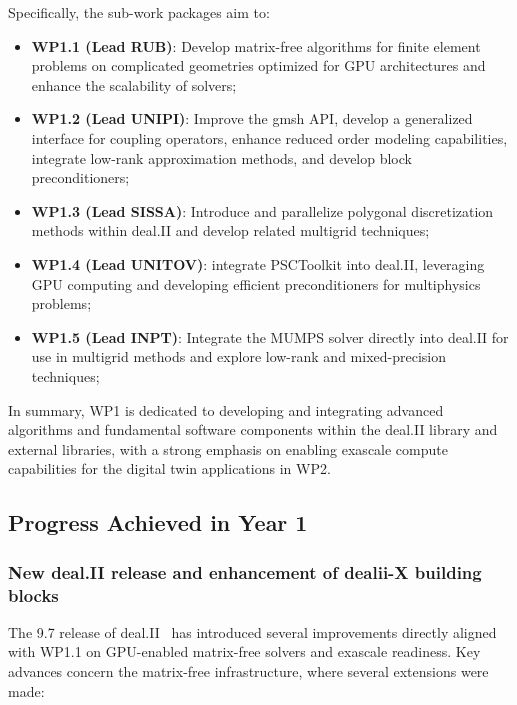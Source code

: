 \documentclass[a4paper,12pt, numbers]{article}
\begin{document}
	Specifically, the sub-work packages aim to:
	\begin{itemize}
        \item \textbf{WP1.1 (Lead RUB)}: Develop matrix-free algorithms for
          finite element problems on complicated geometries optimized for GPU
          architectures and enhance the scalability of solvers;
		\item \textbf{WP1.2 (Lead UNIPI)}: Improve the gmsh API, develop a generalized interface for coupling operators, enhance reduced order modeling capabilities, integrate low-rank approximation methods, and develop block preconditioners;
		\item \textbf{WP1.3 (Lead SISSA)}: Introduce and parallelize polygonal discretization methods within deal.II and develop related multigrid techniques;
		\item \textbf{WP1.4 (Lead UNITOV)}: integrate PSCToolkit into deal.II, leveraging GPU computing and developing efficient preconditioners for multiphysics problems;
		\item \textbf{WP1.5 (Lead INPT)}: Integrate the MUMPS solver directly into deal.II for use in multigrid methods and explore low-rank and mixed-precision techniques;
	\end{itemize}
	
	In summary, WP1 is dedicated to developing and integrating advanced algorithms and fundamental software components within the deal.II library and external libraries, with a strong emphasis on enabling exascale compute capabilities for the digital twin applications in WP2.
	
	\subsection{Progress Achieved in Year 1} %
	
	\subsubsection*{New deal.II release and enhancement of dealii-X building blocks}
	
	The 9.7 release of deal.II~\cite{deal.II.9.7} has introduced several improvements directly aligned
	with WP1.1 on GPU-enabled matrix-free solvers and exascale readiness.  
	Key advances concern the matrix-free infrastructure, where several extensions were made:
	
\end{document}
